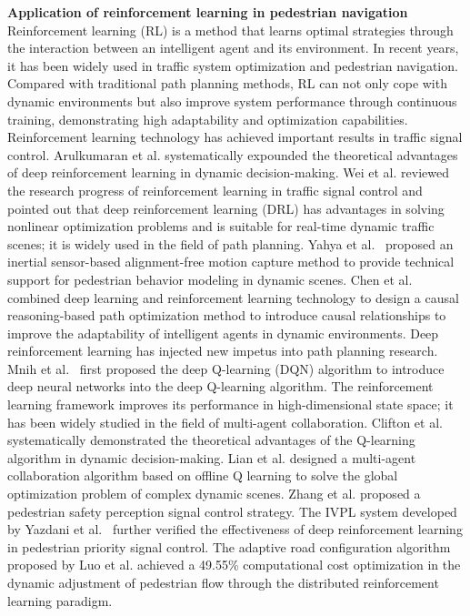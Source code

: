 \documentclass[lettersize,journal]{IEEEtran}
\begin{document}
\textbf{Application of reinforcement learning in pedestrian navigation}
Reinforcement learning (RL) is a method that learns optimal strategies through the interaction between an intelligent agent and its environment. 
In recent years, it has been widely used in traffic system optimization and pedestrian navigation. 
Compared with traditional path planning methods, RL can not only cope with dynamic environments but also improve system performance through continuous training, demonstrating high adaptability and optimization capabilities. 
Reinforcement learning technology has achieved important results in traffic signal control. 
Arulkumaran et al.\cite{arulkumaran2017deep} systematically expounded the theoretical advantages of deep reinforcement learning in dynamic decision-making. 
Wei et al. \cite{wei2021recent} reviewed the research progress of reinforcement learning in traffic signal control and pointed out that deep reinforcement learning (DRL) has advantages in solving nonlinear optimization problems and is suitable for real-time dynamic traffic scenes; it is widely used in the field of path planning. 
Yahya et al.~\cite{yahya2019motion} proposed an inertial sensor-based alignment-free motion capture method to provide technical support for pedestrian behavior modeling in dynamic scenes. 
Chen et al.\cite{chen2018ionet} combined deep learning and reinforcement learning technology to design a causal reasoning-based path optimization method to introduce causal relationships to improve the adaptability of intelligent agents in dynamic environments. Deep reinforcement learning has injected new impetus into path planning research. 
Mnih et al.~\cite{mnih2013playing} first proposed the deep Q-learning (DQN) algorithm to introduce deep neural networks into the deep Q-learning algorithm. 
The reinforcement learning framework improves its performance in high-dimensional state space; 
it has been widely studied in the field of multi-agent collaboration. 
Clifton et al.\cite{clifton2020q} systematically demonstrated the theoretical advantages of the Q-learning algorithm in dynamic decision-making. 
Lian et al.\cite{lian2023off} designed a multi-agent collaboration algorithm based on offline Q learning to solve the global optimization problem of complex dynamic scenes. 
Zhang et al.\cite{zhang2019pedestrian} proposed a pedestrian safety perception signal control strategy. 
The IVPL system developed by Yazdani et al.~\cite{yazdani2023intelligent} further verified the effectiveness of deep reinforcement learning in pedestrian priority signal control. 
The adaptive road configuration algorithm proposed by Luo et al.\cite{ye2022adaptive} achieved a 49.55\% computational cost optimization in the dynamic adjustment of pedestrian flow through the distributed reinforcement learning paradigm.
\end{document}
